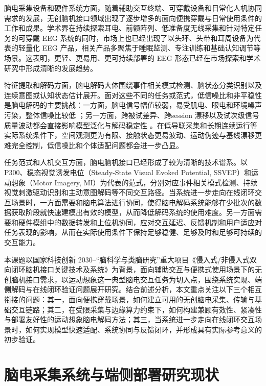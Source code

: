 脑电采集设备和硬件系统方面，随着辅助交互终端、可穿戴设备和日常化人机协同需求的发展，无创脑机接口领域出现了逐步增多的面向便携穿戴与日常使用条件的工作和成果。学术界在持续探索耳电、前额阵列、低准备度无线采集和针对特定任务的可穿戴 EEG 系统\cite{He23, Nis22, Arn20, Deb15, Bio22}的同时，市场上也已经出现了以头环、头带和耳周设备为代表的轻量化 EEG 产品，相关产品多聚焦于睡眠监测、专注训练和基础认知调节等场景。这表明，更轻、更易用、更可持续部署的 EEG 形态已经在市场探索和学术研究中形成清晰的发展趋势。

特征提取和解码方面，脑电解码大体围绕事件相关模式检测、脑状态分类识别以及连续意图或认知状态估计展开。面对这些不同的任务或范式，低信噪比和非平稳性是脑电解码的主要挑战：一方面，脑电信号幅值较弱，易受肌电、眼电和环境噪声污染，整体信噪比较低 \cite{goncharova2003emg, lotte2018review}；另一方面，跨被试差异、跨session 漂移以及试次级信号质量波动都会直接影响模型泛化与解码稳定性 \cite{lotte2018review, kwon2019subject, li2024joint, Zho16}。在低导联采集和长期连续运行等实际系统条件下，空间观测更为有限、接触状态更易波动、运动伪迹与基线漂移更难完全控制，低信噪比和个体适配问题都会进一步凸显。

任务范式和人机交互方面，脑电脑机接口已经形成了较为清晰的技术谱系。以 P300、稳态视觉诱发电位（Steady-State Visual Evoked Potential, SSVEP）和运动想象（Motor Imagery, MI）为代表的范式，分别对应事件相关模式检测、持续视觉刺激驱动识别和主动意图解码等不同交互路径\cite{farwell1988talking, bin2011high, pfurtscheller1999event}。当系统进一步走向在线闭环交互场景时，一方面需要和脑电算法进行协同，使得脑电解码系统能够在少批次的数据获取阶段就快速建模出有效的模型，从而降低解码系统的使用难度。另一方面需要和硬件模组中的数据转发和上位机协同，应对交互延迟、反馈机制和用户适应对任务表现的影响，从而在实际使用条件下保持足够稳健、足够及时和足够可持续的交互能力。

本课题以国家科技创新 2030--“脑科学与类脑研究”重大项目《侵入式/非侵入式双向闭环脑机接口关键技术及系统》为背景，面向辅助交互与便携式使用场景下的无创脑机接口需求，以运动想象这一典型脑电交互任务为切入点，围绕系统实现、端侧解码与在线闭环验证问题展开研究。结合前述分析，本文重点关注以下三个相互衔接的问题：其一，面向便携穿戴场景，如何建立可用的无创脑电采集、传输与基础交互链路；其二，在受限采集与边缘算力约束下，如何构建兼顾有效性、紧凑性与部署友好性的运动想象脑电解码方法；其三，当系统进一步走向在线闭环交互场景时，如何实现模型快速适配、系统协同与反馈闭环，并形成具有实际参考意义的初步验证。

\section{脑电采集系统与端侧部署研究现状}

